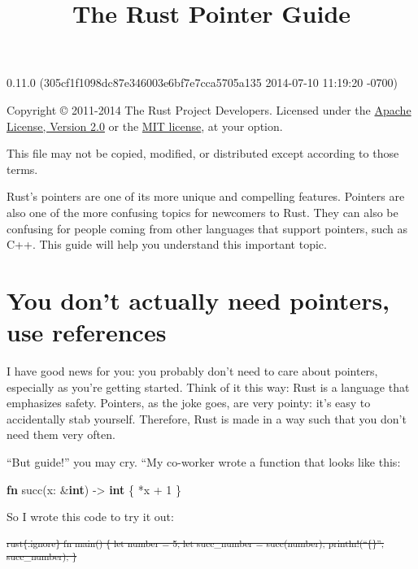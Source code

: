 \documentclass[]{article}
\title{The Rust Pointer Guide}
\newenvironment{Shaded}{}{}
\newcommand{\KeywordTok}[1]{\textcolor[rgb]{0.00,0.44,0.13}{\textbf{{#1}}}}
\newcommand{\DecValTok}[1]{\textcolor[rgb]{0.25,0.63,0.44}{{#1}}}
\newcommand{\NormalTok}[1]{{#1}}
\begin{document}
\maketitle

0.11.0 (305cf1f1098dc87e346003e6bf7e7cca5705a135 2014-07-10 11:19:20 -0700)

Copyright © 2011-2014 The Rust Project Developers. Licensed under the
\href{http://www.apache.org/licenses/LICENSE-2.0}{Apache License,
Version 2.0} or the \href{http://opensource.org/licenses/MIT}{MIT
license}, at your option.

This file may not be copied, modified, or distributed except according
to those terms.

{
\hypersetup{linkcolor=black}
\setcounter{tocdepth}{3}
\tableofcontents
}
Rust's pointers are one of its more unique and compelling features.
Pointers are also one of the more confusing topics for newcomers to
Rust. They can also be confusing for people coming from other languages
that support pointers, such as C++. This guide will help you understand
this important topic.

\section{You don't actually need pointers, use
references}\label{you-dont-actually-need-pointers-use-references}

I have good news for you: you probably don't need to care about
pointers, especially as you're getting started. Think of it this way:
Rust is a language that emphasizes safety. Pointers, as the joke goes,
are very pointy: it's easy to accidentally stab yourself. Therefore,
Rust is made in a way such that you don't need them very often.

``But guide!'' you may cry. ``My co-worker wrote a function that looks
like this:

\begin{Shaded}
\begin{Highlighting}[]
\KeywordTok{fn} \NormalTok{succ(x: &}\KeywordTok{int}\NormalTok{) -> }\KeywordTok{int} \NormalTok{\{ *x + }\DecValTok{1} \NormalTok{\}}
\end{Highlighting}
\end{Shaded}

So I wrote this code to try it out:

\textsubscript{\sout{rust\{.ignore\} fn main() \{ let number = 5; let
succ\_number = succ(number); println!(``\{\}'', succ\_number); \}}}
\end{document}
